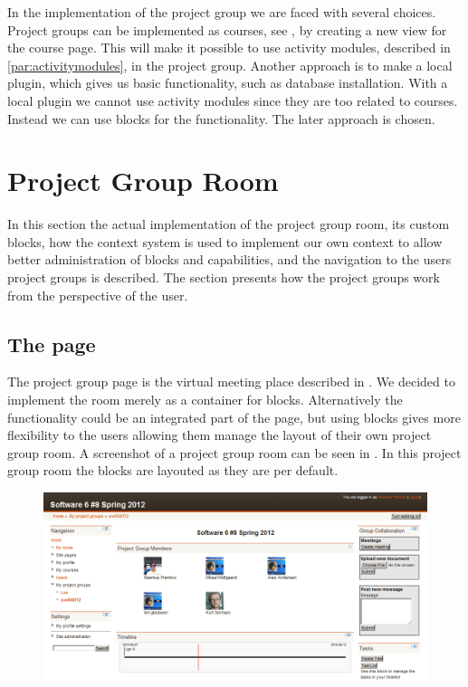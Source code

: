 In the implementation of the project group we are faced with several choices. 
Project groups can be implemented as courses, see , by creating a new view for the course page.  
This will make it possible to use activity modules, described in \ref{par:activitymodules}, in the project group. 
Another approach is to make a local plugin, which gives us basic functionality, such as database installation. 
With a local plugin we cannot use activity modules since they are too related to courses. 
Instead we can use blocks for the functionality. 
The later approach is chosen. 

\section{Project Group Room}
In this section the actual implementation of the project group room, its custom blocks, how the context system is used to implement our own context to allow better administration of blocks and capabilities, and the navigation to the users project groups is described.
The section presents how the project groups work from the perspective of the user. 


\subsection{The page}
The project group page is the virtual meeting place described in .
We decided to implement the room merely as a container for blocks. 
Alternatively the functionality could be an integrated part of the page, but using blocks gives more flexibility to the users allowing them manage the layout of their own project group room. 
A screenshot of a project group room can be seen in . 
In this project group room the blocks are layouted as they are per default. 
\begin{figure}[h]
	\centering
		\includegraphics[width=\textwidth]{images/projectgroupnoedit.png}
	\label{fig:projectgroupnoedit}
\end{figure}

